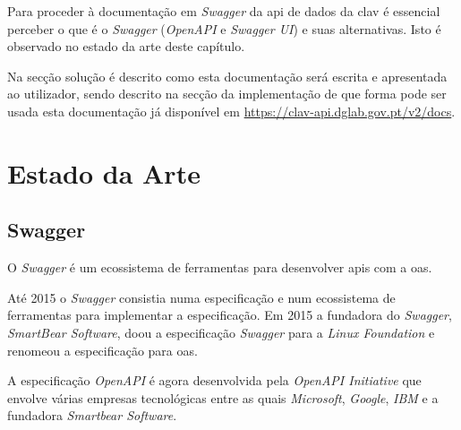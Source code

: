 Para proceder à documentação em \textit{Swagger} da \acrshort{api} de dados da \acrshort{clav} é essencial perceber o que é o \textit{Swagger} (\textit{OpenAPI} e \textit{Swagger UI}) e suas alternativas. Isto é observado no estado da arte deste capítulo.

Na secção solução é descrito como esta documentação será escrita e apresentada ao utilizador, sendo descrito na secção da implementação de que forma pode ser usada esta documentação já disponível em \url{https://clav-api.dglab.gov.pt/v2/docs}.

\section{Estado da Arte}

\subsection{Swagger}
O \textit{Swagger} é um ecossistema de ferramentas para desenvolver \acrshort{api}s com a \acrfull{oas}.

Até 2015 o \textit{Swagger} consistia numa especificação e num ecossistema de ferramentas para implementar a 
especificação. Em 2015 a fundadora do \textit{Swagger}, \textit{SmartBear Software}, doou a especificação 
\textit{Swagger} para a \textit{Linux Foundation} e renomeou a especificação para \acrlong{oas}.~\cite{wiswagger}

A especificação \textit{OpenAPI} é agora desenvolvida pela \textit{OpenAPI Initiative} que envolve várias 
empresas tecnológicas entre as quais \textit{Microsoft}, \textit{Google}, \textit{IBM} e a 
fundadora \textit{Smartbear Software}.

